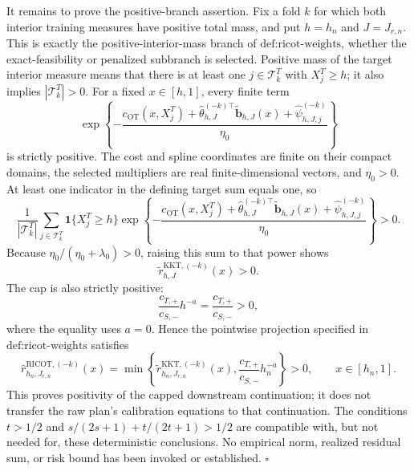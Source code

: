 It remains to prove the positive-branch assertion.  Fix a fold \(k\) for
which both interior training measures have positive total mass, and put
\(h=h_n\) and \(J=J_{r,n}\).  This is exactly the positive-interior-mass
branch of \(\text{def:ricot-weights}\), whether the exact-feasibility or
penalized subbranch is selected.  Positive mass of the target interior
measure means that there is at least one \(j\in\mathcal T^T_k\) with
\(X_j^T\ge h\); it also implies \(|\mathcal T^T_k|>0\).  For a fixed
\(x\in[h,1]\), every finite term
\[
 \exp\!\left\{-\frac{
 c_{\mathrm{OT}}(x,X_j^T)
 +\widehat\theta_{h,J}^{(-k)\top}
   \widetilde{\mathbf b}_{h,J}(x)
 +\widehat\psi_{h,J,j}^{(-k)}}{\eta_0}\right\}
\]
is strictly positive.  The cost and spline coordinates are finite on their
compact domains, the selected multipliers are real finite-dimensional
vectors, and \(\eta_0>0\).  At least one indicator in the defining target
sum equals one, so
\[
 \frac1{|\mathcal T^T_k|}
 \sum_{j\in\mathcal T^T_k}\mathbf 1\{X_j^T\ge h\}
 \exp\!\left\{-\frac{
 c_{\mathrm{OT}}(x,X_j^T)
 +\widehat\theta_{h,J}^{(-k)\top}
   \widetilde{\mathbf b}_{h,J}(x)
 +\widehat\psi_{h,J,j}^{(-k)}}{\eta_0}\right\}>0.
\]
Because \(\eta_0/(\eta_0+\lambda_0)>0\), raising this sum to that power
shows
\[
 \widetilde r^{\mathrm{KKT},(-k)}_{h,J}(x)>0.
\]
The cap is also strictly positive:
\[
 \frac{c_{T,+}}{c_{S,-}}h^{-a}
 =\frac{c_{T,+}}{c_{S,-}}>0,
\]
where the equality uses \(a=0\).  Hence the pointwise projection specified
in \(\text{def:ricot-weights}\) satisfies
\[
 \widehat r^{\mathrm{RICOT},(-k)}_{h_n,J_{r,n}}(x)
 =\min\!\left\{
 \widetilde r^{\mathrm{KKT},(-k)}_{h_n,J_{r,n}}(x),
 \frac{c_{T,+}}{c_{S,-}}h_n^{-a}
 \right\}>0,
 \qquad x\in[h_n,1].
\]
This proves positivity of the capped downstream continuation; it does not
transfer the raw plan's calibration equations to that continuation.  The
conditions \(t>1/2\) and
\(s/(2s+1)+t/(2t+1)>1/2\) are compatible with, but not needed for, these
deterministic conclusions.  No empirical norm, realized residual sum, or
risk bound has been invoked or established. \(\square\)